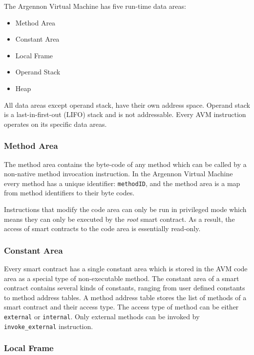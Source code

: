 The Argennon Virtual Machine has five run-time data areas:
\begin{itemize}
    \item Method Area
    \item Constant Area
    \item Local Frame
    \item Operand Stack
    \item Heap
\end{itemize}
All data areas except operand stack, have their own address space. Operand stack is a
last-in-first-out (LIFO) stack and is not addressable. Every AVM instruction operates on its specific
data areas.

\subsubsection{Method Area}

The method area contains the byte-code of any method which can be called by a non-native method invocation
instruction. In the Argennon Virtual Machine every method has a unique identifier:
\texttt{methodID}, and the method area is a map from method identifiers to their byte codes.

Instructions that modify the code area can only be run in privileged mode which means they can only be executed
by the \emph{root} smart contract. As a result, the access of smart contracts to the code area is essentially
read-only.

\subsubsection{Constant Area}

Every smart contract has a single constant area which is stored in the AVM code area as a special type of
non-executable method. The constant area of a smart contract contains several kinds of constants, ranging from user
defined constants to method address tables. A method address table stores the list of methods of a smart
contract and their access type. The access type of method can be either \texttt{external} or \texttt{internal}.
Only external methods can be invoked by \texttt{invoke\_external} instruction.



\subsubsection{Local Frame}

